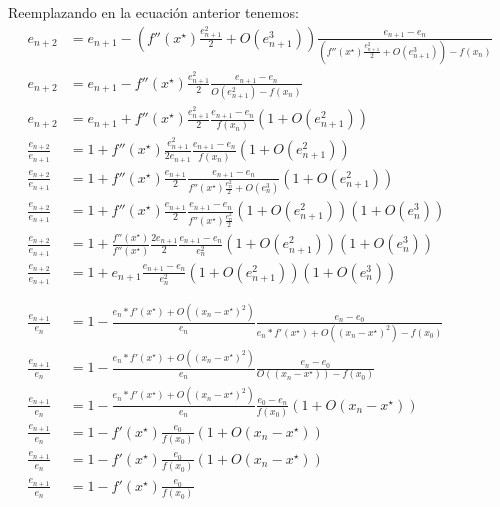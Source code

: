 \documentclass[spanish, fleqn]{article}
\newcommand{\xstar}{x^\star}
\begin{document}
\begin{enumerate}
    Reemplazando en la ecuación anterior tenemos:
    \begin{align*}
        e_{n+2} &= e_{n+1} - (f''(\xstar)\frac{e_{n+1}^2}{2} + O(e_{n+1}^3))\frac{e_{n+1} - e_{n}}{(f''(\xstar)\frac{e_{n+1}^2}{2} + O(e_{n+1}^3)) - f(x_n)} \\
        e_{n+2} &= e_{n+1} - f''(\xstar)\frac{e_{n+1}^2}{2}\frac{e_{n+1} - e_{n}}{O(e_{n+1}^2) - f(x_n)} \\
        e_{n+2} &= e_{n+1} + f''(\xstar)\frac{e_{n+1}^2}{2}\frac{e_{n+1} - e_{n}}{f(x_n)} (1 + O(e_{n+1}^2) ) \\
        \frac{e_{n+2}}{e_{n+1}} &= 1 + f''(\xstar)\frac{e_{n+1}^2}{2e_{n+1}}\frac{e_{n+1} - e_{n}}{f(x_n)} (1 + O(e_{n+1}^2) ) \\
        \frac{e_{n+2}}{e_{n+1}} &= 1 + f''(\xstar)\frac{e_{n+1}}{2}\frac{e_{n+1} - e_{n}}{f''(\xstar)\frac{e_n^2}{2} + O(e_n^3)} (1 + O(e_{n+1}^2) ) \\
        \frac{e_{n+2}}{e_{n+1}} &= 1 + f''(\xstar)\frac{e_{n+1}}{2}\frac{e_{n+1} - e_{n}}{f''(\xstar)\frac{e_n^2}{2}} (1 + O(e_{n+1}^2) ) (1 + O(e_n^3)) \\
        \frac{e_{n+2}}{e_{n+1}} &= 1 + \frac{f''(\xstar)}{f''(\xstar)}\frac{2e_{n+1}}{2}\frac{e_{n+1} - e_{n}}{e_n^2} (1 + O(e_{n+1}^2) ) (1 + O(e_n^3)) \\
        \frac{e_{n+2}}{e_{n+1}} &= 1 + e_{n+1}\frac{e_{n+1} - e_{n}}{e_n^2} (1 + O(e_{n+1}^2) ) (1 + O(e_n^3)) \\
        \\
        \\
        \frac{e_{n+1}}{e_n} &= 1 - \frac{e_n * f'(\xstar)  + O((x_n - \xstar)^2)}{e_n}\frac{e_n - e_0}{e_n*f'(\xstar) + O((x_n - \xstar)^2) - f(x_0)} \\
        \frac{e_{n+1}}{e_n} &= 1 - \frac{e_n * f'(\xstar)  + O((x_n - \xstar)^2)}{e_n}\frac{e_n - e_0}{ O((x_n - \xstar)) - f(x_0)} \\
        \frac{e_{n+1}}{e_n} &= 1 - \frac{e_n * f'(\xstar)  + O((x_n - \xstar)^2)}{e_n}\frac{e_0 - e_n}{f(x_0)}(1 + O(x_n - \xstar)) \\
        \frac{e_{n+1}}{e_n} &= 1 - f'(\xstar)  \frac{e_0}{f(x_0)}(1 + O(x_n - \xstar)) \\
        \frac{e_{n+1}}{e_n} &= 1 - f'(\xstar) \frac{e_0}{f(x_0)}(1 + O(x_n - \xstar)) \\
        \frac{e_{n+1}}{e_n} &= 1 - f'(\xstar) \frac{e_0}{f(x_0)}
    \end{align*}
    
\end{enumerate}
\end{document}
